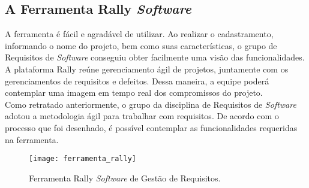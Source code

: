 		\subsection[A Ferramenta Rally \emph{Software}]{A Ferramenta Rally \emph{Software}}
		\label{subsec:ferramenta_analise_rally}
			A ferramenta é fácil e agradável de utilizar. Ao realizar o cadastramento, informando o nome do projeto, bem como suas características, o grupo de Requisitos de \emph{Software} conseguiu obter facilmente uma visão das funcionalidades. A plataforma Rally reúne gerenciamento ágil de projetos, juntamente com os gerenciamentos de requisitos e defeitos. Dessa maneira, a equipe poderá contemplar uma imagem em tempo real dos compromissos do projeto.
			\\ \indent Como retratado anteriormente, o grupo da disciplina de Requisitos de \emph{Software} adotou a metodologia ágil para trabalhar com requisitos. De acordo com o processo que foi desenhado, é possível contemplar as funcionalidades requeridas na ferramenta.
			\begin{figure}[h]
				\centering
				\texttt{[image: ferramenta\_rally]}
				\caption[Ferramenta Rally \emph{Software} de Gestão de Requisitos]{Ferramenta Rally \emph{Software} de Gestão de Requisitos.}
				\label{fig:ferramenta_rally}
			\end{figure}

		\ \newline
